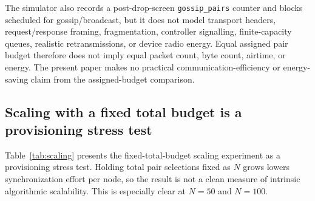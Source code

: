 \documentclass[11pt]{article}
\begin{document}
The simulator also records a post-drop-screen \texttt{gossip\_pairs} counter and blocks scheduled for gossip/broadcast, but it does not model transport headers, request/response framing, fragmentation, controller signalling, finite-capacity queues, realistic retransmissions, or device radio energy. Equal assigned pair budget therefore does not imply equal packet count, byte count, airtime, or energy. The present paper makes no practical communication-efficiency or energy-saving claim from the assigned-budget comparison.

\subsection{Scaling with a fixed total budget is a provisioning stress test}
Table~\ref{tab:scaling} presents the fixed-total-budget scaling experiment as a provisioning stress test. Holding total pair selections fixed as $N$ grows lowers synchronization effort per node, so the result is not a clean measure of intrinsic algorithmic scalability. This is especially clear at $N=50$ and $N=100$.
\end{document}
